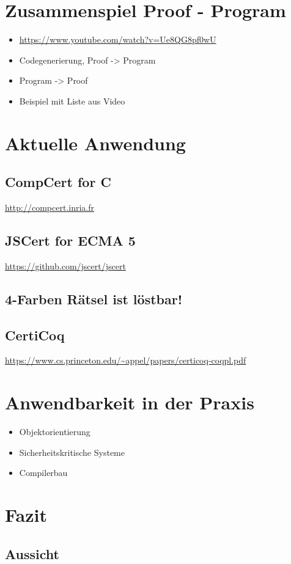 \section{Zusammenspiel Proof - Program}
\begin{itemize}
	\item \url{https://www.youtube.com/watch?v=Ue8QG8pf0wU}
	\item Codegenerierung, Proof -> Program
	\item Program -> Proof
	\item Beispiel mit Liste aus Video
\end{itemize}

\section{Aktuelle Anwendung}
\subsection{CompCert for C}
\url{http://compcert.inria.fr}
\subsection{JSCert for ECMA 5}
\url{https://github.com/jscert/jscert}
\subsection{4-Farben Rätsel ist löstbar!}
\subsection{CertiCoq}
\url{https://www.cs.princeton.edu/~appel/papers/certicoq-coqpl.pdf}

\section{Anwendbarkeit in der Praxis}
\begin{itemize}
	\item Objektorientierung
	\item Sicherheitskritische Systeme
	\item Compilerbau
\end{itemize}


\section{Fazit}
\subsection{Aussicht}

